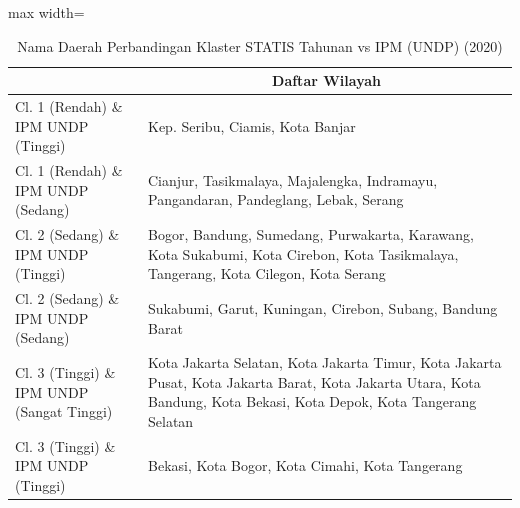 \begin{table}[H]
\centering
\caption{Nama Daerah Perbandingan Klaster STATIS Tahunan vs IPM (UNDP) (2020)} \label{tab:app2statis_ipm_name_2020}
\begin{adjustbox}{max width=\textwidth}
\begin{tabular}{|>{\centering\arraybackslash}p{4cm}|p{10cm}|}
\hline
\multicolumn{1}{|c|}{\textbf{Kategori}} & \multicolumn{1}{c|}{\textbf{Daftar Wilayah}} \\
\hline
Cl. 1 (Rendah) \& IPM UNDP (Tinggi) & Kep. Seribu, Ciamis, Kota Banjar \\
\hline
Cl. 1 (Rendah) \& IPM UNDP (Sedang) & Cianjur, Tasikmalaya, Majalengka, Indramayu, Pangandaran, Pandeglang, Lebak, Serang \\
\hline
Cl. 2 (Sedang) \& IPM UNDP (Tinggi) & Bogor, Bandung, Sumedang, Purwakarta, Karawang, Kota Sukabumi, Kota Cirebon, Kota Tasikmalaya, Tangerang, Kota Cilegon, Kota Serang \\
\hline
Cl. 2 (Sedang) \& IPM UNDP (Sedang) & Sukabumi, Garut, Kuningan, Cirebon, Subang, Bandung Barat \\
\hline
Cl. 3 (Tinggi) \& IPM UNDP (Sangat Tinggi) & Kota Jakarta Selatan, Kota Jakarta Timur, Kota Jakarta Pusat, Kota Jakarta Barat, Kota Jakarta Utara, Kota Bandung, Kota Bekasi, Kota Depok, Kota Tangerang Selatan \\
\hline
Cl. 3 (Tinggi) \& IPM UNDP (Tinggi) & Bekasi, Kota Bogor, Kota Cimahi, Kota Tangerang \\
\hline
\end{tabular}
\end{adjustbox}
\end{table}